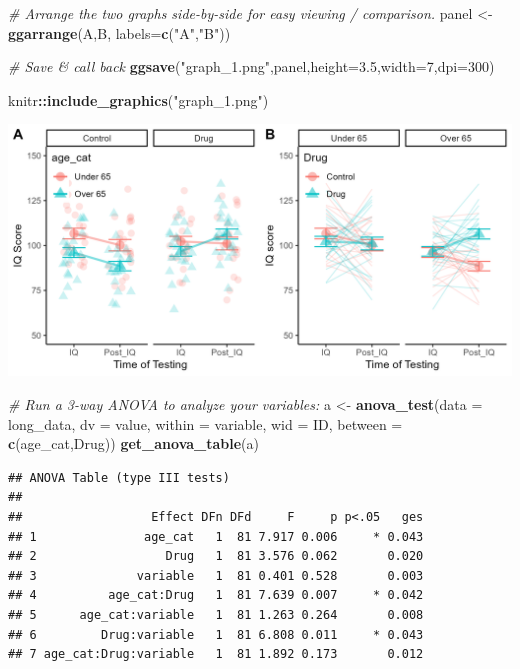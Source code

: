 \documentclass[
]{book}
\newenvironment{Shaded}{\begin{snugshade}}{\end{snugshade}}
\newcommand{\AttributeTok}[1]{\textcolor[rgb]{0.13,0.29,0.53}{#1}}
\newcommand{\CommentTok}[1]{\textcolor[rgb]{0.56,0.35,0.01}{\textit{#1}}}
\newcommand{\DecValTok}[1]{\textcolor[rgb]{0.00,0.00,0.81}{#1}}
\newcommand{\FloatTok}[1]{\textcolor[rgb]{0.00,0.00,0.81}{#1}}
\newcommand{\FunctionTok}[1]{\textcolor[rgb]{0.13,0.29,0.53}{\textbf{#1}}}
\newcommand{\NormalTok}[1]{#1}
\newcommand{\OtherTok}[1]{\textcolor[rgb]{0.56,0.35,0.01}{#1}}
\newcommand{\SpecialCharTok}[1]{\textcolor[rgb]{0.81,0.36,0.00}{\textbf{#1}}}
\newcommand{\StringTok}[1]{\textcolor[rgb]{0.31,0.60,0.02}{#1}}
\begin{document}
\begin{Shaded}
\begin{Highlighting}[]
\CommentTok{\# Arrange the two graphs side{-}by{-}side for easy viewing / comparison. }
\NormalTok{panel }\OtherTok{\textless{}{-}} \FunctionTok{ggarrange}\NormalTok{(A,B,}
          \AttributeTok{labels=}\FunctionTok{c}\NormalTok{(}\StringTok{"A"}\NormalTok{,}\StringTok{"B"}\NormalTok{))}

\CommentTok{\# Save \& call back}
\FunctionTok{ggsave}\NormalTok{(}\StringTok{"graph\_1.png"}\NormalTok{,panel,}\AttributeTok{height=}\FloatTok{3.5}\NormalTok{,}\AttributeTok{width=}\DecValTok{7}\NormalTok{,}\AttributeTok{dpi=}\DecValTok{300}\NormalTok{)}

\NormalTok{knitr}\SpecialCharTok{::}\FunctionTok{include\_graphics}\NormalTok{(}\StringTok{"graph\_1.png"}\NormalTok{)}
\end{Highlighting}
\end{Shaded}

\includegraphics[width=29.17in]{graph_1}

\begin{Shaded}
\begin{Highlighting}[]
\CommentTok{\# Run a 3{-}way ANOVA to analyze your variables: }
\NormalTok{a }\OtherTok{\textless{}{-}} \FunctionTok{anova\_test}\NormalTok{(}\AttributeTok{data =}\NormalTok{ long\_data, }\AttributeTok{dv =}\NormalTok{ value, }\AttributeTok{within =}\NormalTok{ variable, }\AttributeTok{wid =}\NormalTok{ ID, }\AttributeTok{between =} \FunctionTok{c}\NormalTok{(age\_cat,Drug))}
\FunctionTok{get\_anova\_table}\NormalTok{(a)}
\end{Highlighting}
\end{Shaded}

\begin{verbatim}
## ANOVA Table (type III tests)
## 
##                  Effect DFn DFd     F     p p<.05   ges
## 1               age_cat   1  81 7.917 0.006     * 0.043
## 2                  Drug   1  81 3.576 0.062       0.020
## 3              variable   1  81 0.401 0.528       0.003
## 4          age_cat:Drug   1  81 7.639 0.007     * 0.042
## 5      age_cat:variable   1  81 1.263 0.264       0.008
## 6         Drug:variable   1  81 6.808 0.011     * 0.043
## 7 age_cat:Drug:variable   1  81 1.892 0.173       0.012
\end{verbatim}
\end{document}
